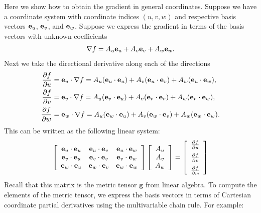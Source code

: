Here we show how to obtain the gradient in general coordinates. Suppose we have a coordinate system with coordinate indices $(u,v,w)$ and respective basis vectors $\mathbf{e}_u$, $\mathbf{e}_v$, and $\mathbf{e}_w$. Suppose we express the gradient in terms of the basis vectors with unknown coefficients 
\begin{align}
  \nabla f = A_u \mathbf{e}_u + A_v \mathbf{e}_v + A_w \mathbf{e}_w .
\end{align}
Next we take the directional derivative along each of the directions
\begin{subequations}
\begin{align}
  \frac{ \partial {f} }{ \partial {u} } &= \mathbf{e}_u \cdot \nabla f = A_u ( \mathbf{e}_u \cdot \mathbf{e}_u ) + A_v ( \mathbf{e}_u \cdot \mathbf{e}_v ) + A_w ( \mathbf{e}_u \cdot \mathbf{e}_w ), \\
  \frac{ \partial {f} }{ \partial {v} } &= \mathbf{e}_v \cdot \nabla f = A_u ( \mathbf{e}_v \cdot \mathbf{e}_u ) + A_v ( \mathbf{e}_v \cdot \mathbf{e}_v ) + A_w ( \mathbf{e}_v \cdot \mathbf{e}_w ), \\
  \frac{ \partial {f} }{ \partial {w} } &= \mathbf{e}_w \cdot \nabla f = A_u ( \mathbf{e}_w \cdot \mathbf{e}_u ) + A_v ( \mathbf{e}_w \cdot \mathbf{e}_v ) + A_w ( \mathbf{e}_w \cdot \mathbf{e}_w ) .
\end{align}
\end{subequations}
This can be written as the following linear system:
\begin{align}
  \left[ \begin{array}{c c c} 
  \evec_u \cdot \evec_u & \evec_u \cdot \evec_v & \evec_u \cdot \evec_w \\
  \evec_v \cdot \evec_u & \evec_v \cdot \evec_v & \evec_v \cdot \evec_w \\
  \evec_w \cdot \evec_u & \evec_w \cdot \evec_v & \evec_w \cdot \evec_w \\ \end{array} \right]
  \left[ \begin{array}{c} A_u \\ A_v \\ A_w \\ \end{array} \right] = 
  \left[ \begin{array}{c} \dho{f}{u} \vspace{0.2cm} \\  \dho{f}{v} \vspace{0.2cm} \\ \dho{f}{w} \\ \end{array} \right]
\end{align}
Recall that this matrix is the metric tensor $\mathbf{g}$ from linear algebra. To compute the elements of the metric tensor, we express the basis vectors in terms of Cartesian coordinate partial derivatives using the multivariable chain rule. For example:
